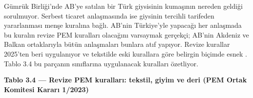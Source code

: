 Gümrük Birliği'nde AB'ye satılan bir Türk giysisinin kumaşının nereden geldiği sorulmuyor. Serbest ticaret anlaşmasında ise giysinin tercihli tarifeden yararlanması menşe kuralına bağlı. AB'nin Türkiye'yle yapacağı her anlaşmada bu kuralın revize PEM kuralları olacağını varsaymak gerçekçi; AB'nin Akdeniz ve Balkan ortaklarıyla bütün anlaşmaları bunlara atıf yapıyor. Revize kurallar 2025'ten beri uygulanıyor ve tekstilde eski kurallara göre belirgin biçimde esnek \etiketV{}. Tablo 3.4 bu parçanın sınıflarına uygulanacak kuralları özetliyor.


\textbf{Tablo 3.4 --- Revize PEM kuralları: tekstil, giyim ve deri (PEM Ortak Komitesi Kararı 1/2023)}

\nopagebreak[4]

\begingroup\gbtablo\small

